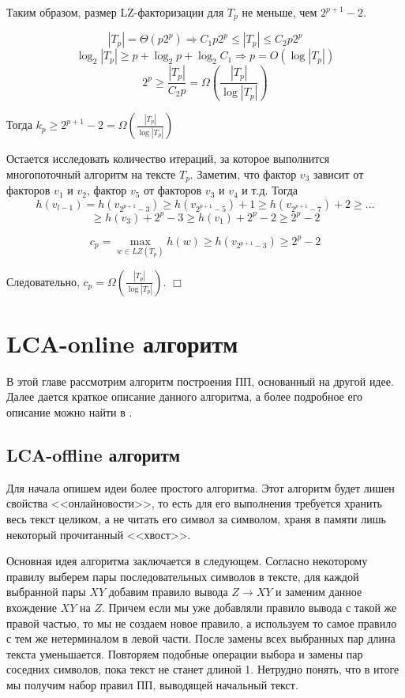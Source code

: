 \documentclass[14pt]{article}
\begin{document}
	Таким образом, размер LZ-факторизации для $T_p$ не меньше, чем $2^{p+1}-2$.

	\[ |T_p| = \Theta(p2^p) \Rightarrow C_1p2^p \leq |T_p| \leq C_2p2^p \]
	\[ \log_2|T_p| \geq p + \log_2 p + \log_2 C_1 \Rightarrow p = O(\log|T_p|) \]
	\[ 2^p \geq \frac{|T_p|}{C_2p} = \Omega\left(\frac{|T_p|}{\log|T_p|}\right) \]

	Тогда $k_p \geq 2^{p+1}-2 = \Omega\left(\frac{|T_p|}{\log|T_p|}\right)$

	Остается исследовать количество итераций, за которое выполнится многопоточный алгоритм на тексте $T_p$.
	Заметим, что фактор $v_3$ зависит от факторов $v_1$ и $v_2$, фактор $v_5$ от факторов $v_3$ и $v_4$ и т.д.
	Тогда 
	\[ h(v_{l-1}) = h(v_{2^{p+1}-3}) \geq h(v_{2^{p+1}-5}) + 1 \geq h(v_{2^{p+1}-7}) + 2 \geq \ldots \]
	\[ \geq h(v_3) + 2^p-3 \geq h(v_1) + 2^p-2 \geq 2^p-2 \]

	\[ c_p = \max_{w \in LZ(T_p)} h(w) \geq h(v_{2^{p+1}-3}) \geq 2^p-2 \]

	Следовательно, $c_p = \Omega\left(\frac{|T_p|}{\log|T_p|}\right)$. $\Box$	


\section{LCA-online алгоритм}

В этой главе рассмотрим алгоритм построения ПП, основанный на другой идее. Далее дается краткое описание
данного алгоритма, а более подробное его описание можно найти в \cite{LCAOnlineSLP}.

\subsection{LCA-offline алгоритм}

Для начала опишем идеи более простого алгоритма. Этот алгоритм будет лишен свойства <<онлайновости>>,
то есть для его выполнения требуется хранить весь текст целиком, а не читать его символ за символом,
храня в памяти лишь некоторый прочитанный <<хвост>>.

Основная идея алгоритма заключается в следующем. Согласно некоторому правилу выберем пары
последовательных символов в тексте, для каждой выбранной пары $XY$ добавим правило вывода $Z \to XY$
и заменим данное вхождение $XY$ на $Z$. Причем если мы уже добавляли правило вывода с такой же правой
частью, то мы не создаем новое правило, а используем то самое правило с тем же нетерминалом в левой части.
После замены всех выбранных пар длина текста уменьшается. Повторяем подобные операции выбора и замены пар соседних
символов, пока текст не станет длиной 1. Нетрудно понять, что в итоге мы получим набор правил ПП, выводящей начальный текст.
\end{document}
